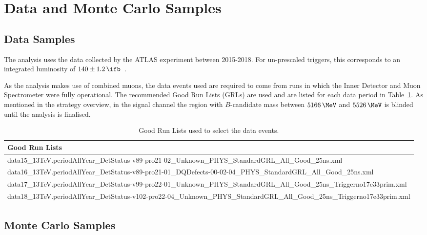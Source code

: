 \section{Data and Monte Carlo Samples}
\label{sec:Samples}


\subsection{Data Samples}
\label{sec:DataSamples}

The analysis uses the data collected by the ATLAS experiment between 2015-2018. 
For un-prescaled triggers, this corresponds to an integrated luminosity of $140 \pm 1.2\,\ifb$~\cite{ATLAS:2022hro}.  

As the analysis makes use of combined muons, the data events used are required to come from runs in which the Inner Detector and Muon Spectrometer were fully operational. 
The recommended Good Run Lists (GRLs) are used and are listed for each data period in Table~\ref{tab:GRLs}.   
As mentioned in the strategy overview, in the signal channel the region with $B$-candidate mass between $5166\,\MeV$ and $5526\,\MeV$ is blinded until the analysis is finalised.    


\begin{table}[h]
    \centering
    \begin{tabular}{|p{1\linewidth}|}
        \hline
        Good Run Lists \\
        \hline
        data15\_13TeV.periodAllYear\_DetStatus-v89-pro21-02\_Unknown\_PHYS\_StandardGRL\_All\_Good\_25ns.xml \\
        data16\_13TeV.periodAllYear\_DetStatus-v89-pro21-01\_DQDefects-00-02-04\_PHYS\_StandardGRL\_All\_Good\_25ns.xml \\
        data17\_13TeV.periodAllYear\_DetStatus-v99-pro22-01\_Unknown\_PHYS\_StandardGRL\_All\_Good\_25ns\break\_Triggerno17e33prim.xml \\
        data18\_13TeV.periodAllYear\_DetStatus-v102-pro22-04\_Unknown\_PHYS\_StandardGRL\_All\_Good\_25ns\break\_Triggerno17e33prim.xml \\
        \hline
    \end{tabular}
    \caption{Good Run Lists used to select the data events.}
    \label{tab:GRLs}
\end{table}


\subsection{Monte Carlo Samples}
\label{sec:MCSamples}

